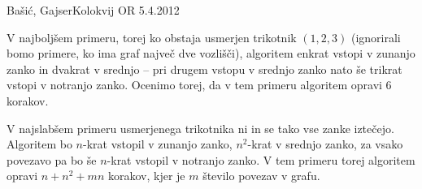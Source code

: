 \begin{naloga}{Bašić, Gajser}{Kolokvij OR 5.4.2012}
\begin{odgovor}
\begin{enumerate}[(a)]
V najboljšem primeru, torej ko obstaja usmerjen trikotnik $(1, 2, 3)$
(ignorirali bomo primere, ko ima graf največ dve vozlišči),
algoritem enkrat vstopi v zunanjo zanko in dvakrat v srednjo
-- pri drugem vstopu v srednjo zanko nato še trikrat vstopi v notranjo zanko.
Ocenimo torej, da v tem primeru algoritem opravi $6$ korakov.

V najslabšem primeru usmerjenega trikotnika ni in se tako vse zanke iztečejo.
Algoritem bo $n$-krat vstopil v zunanjo zanko, $n^2$-krat v srednjo zanko,
za vsako povezavo pa bo še $n$-krat vstopil v notranjo zanko.
V tem primeru torej algoritem opravi $n + n^2 + mn$ korakov,
kjer je $m$ število povezav v grafu.
\end{enumerate}
\end{odgovor}
\end{naloga}

